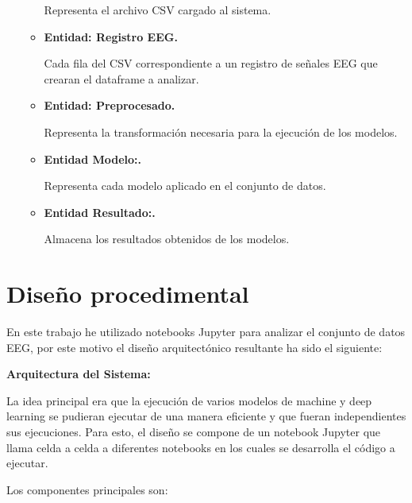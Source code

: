 \begin{enumerate}
\begin{itemize}
    Representa el archivo CSV cargado al sistema.
    
    \item
    \textbf{Entidad: Registro EEG.}
    
    Cada fila del CSV correspondiente a un registro de señales EEG que crearan el dataframe a analizar. 
    
    
    
    \item
    \textbf{Entidad: Preprocesado.}
    
    Representa la transformación necesaria para la ejecución de los modelos. 
    
 
    \item
    \textbf{Entidad Modelo:.}
    
    Representa cada modelo aplicado en el conjunto de datos.
    
    
    \item
    \textbf{Entidad Resultado:.}
    
    Almacena los resultados obtenidos de los modelos.  
       
\end{itemize}
\end{enumerate}






\section{Diseño procedimental}

En este trabajo he utilizado notebooks Jupyter para analizar el conjunto de datos EEG, por este motivo el diseño arquitectónico resultante ha sido el siguiente:


\textbf{Arquitectura del Sistema:}

La idea principal era que la ejecución de varios modelos de machine y deep learning se pudieran ejecutar de una manera eficiente y que fueran independientes sus ejecuciones. 
Para esto, el diseño se compone de un notebook Jupyter que llama celda a celda a diferentes notebooks en los cuales se desarrolla el código a ejecutar. 

Los componentes principales son:

